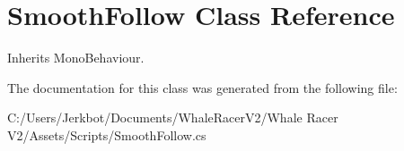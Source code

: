 \hypertarget{class_smooth_follow}{}\section{Smooth\+Follow Class Reference}
\label{class_smooth_follow}


Inherits Mono\+Behaviour.



The documentation for this class was generated from the following file\+:\begin{DoxyCompactItemize}
\item 
C\+:/\+Users/\+Jerkbot/\+Documents/\+Whale\+Racer\+V2/\+Whale Racer V2/\+Assets/\+Scripts/Smooth\+Follow.\+cs\end{DoxyCompactItemize}
